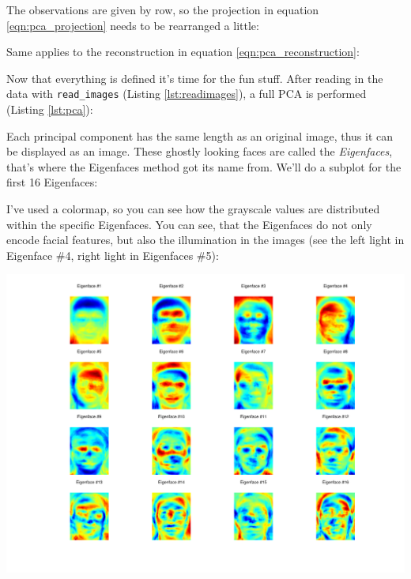 

The observations are given by row, so the projection in equation \ref{eqn:pca_projection} needs to be rearranged a little:



Same applies to the reconstruction in equation \ref{eqn:pca_reconstruction}: 



Now that everything is defined it's time for the fun stuff. After reading in the data with \lstinline|read_images| (Listing \ref{lst:readimages}), a full PCA is performed (Listing \ref{lst:pca}):



Each principal component has the same length as an original image, thus it can be displayed as an image. These ghostly looking faces are called the \textit{Eigenfaces}, that's where the Eigenfaces method got its name from. We'll do a subplot for the first 16 Eigenfaces:



I've used a colormap, so you can see how the grayscale values are distributed within the specific Eigenfaces. You can see, that the Eigenfaces do not only encode facial features, but also the illumination in the images (see the left light in Eigenface \#4, right light in Eigenfaces \#5):

\begin{center}
	\includegraphics[scale=0.6]{img/eigenfaces/pca_eigenfaces}
\end{center}

